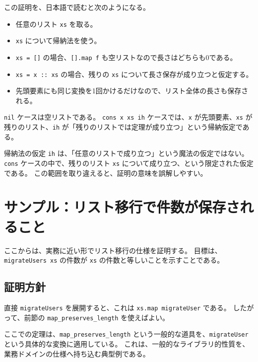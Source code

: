 この証明を、日本語で読むと次のようになる。

\begin{itemize}
\item 任意のリスト \texttt{xs} を取る。
\item \texttt{xs} について帰納法を使う。
\item \texttt{xs = []} の場合、\texttt{[].map f} も空リストなので長さはどちらも0である。
\item \texttt{xs = x :: xs} の場合、残りの \texttt{xs} について長さ保存が成り立つと仮定する。
\item 先頭要素にも同じ変換を1回かけるだけなので、リスト全体の長さも保存される。
\end{itemize}

\texttt{nil} ケースは空リストである。
\texttt{cons x xs ih} ケースでは、\texttt{x} が先頭要素、\texttt{xs} が残りのリスト、\texttt{ih} が「残りのリストでは定理が成り立つ」という帰納仮定である。

\begin{warningbox}
帰納法の仮定 \texttt{ih} は、「任意のリストで成り立つ」という魔法の仮定ではない。
\texttt{cons} ケースの中で、残りのリスト \texttt{xs} について成り立つ、という限定された仮定である。
この範囲を取り違えると、証明の意味を誤解しやすい。
\end{warningbox}

\section{サンプル：リスト移行で件数が保存されること}

ここからは、実務に近い形でリスト移行の仕様を証明する。
目標は、\texttt{migrateUsers xs} の件数が \texttt{xs} の件数と等しいことを示すことである。

\subsection{証明方針}

直接 \texttt{migrateUsers} を展開すると、これは \texttt{xs.map migrateUser} である。
したがって、前節の \texttt{map\_preserves\_length} を使えばよい。

\begin{leanbox}
ここでの定理は、\texttt{map\_preserves\_length} という一般的な道具を、\texttt{migrateUser} という具体的な変換に適用している。
これは、一般的なライブラリ的性質を、業務ドメインの仕様へ持ち込む典型例である。
\end{leanbox}

